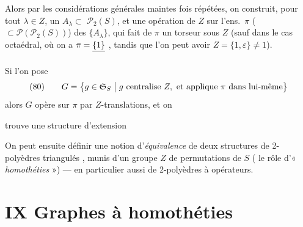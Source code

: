 \documentclass[11pt,a4paper]{article}
\begin{document}
Alors par les considérations générales maintes fois répétées, on construit, pour tout $\lambda \in Z$, un $A_\lambda \subset$ \struck{\ill{}} $\mathcal{P}_2(S)$, et une opération  de $Z$ sur l'ens.\ $\pi$ ($\subset \mathcal{P}(\mathcal{P}_2(S))$) des $\{A_\lambda\}$, qui fait de $\pi$ un torseur sous $Z$ (sauf dans le cas octaédral, où on a $\pi = \struck{\{1\}}$ , tandis que l'on peut avoir $Z = \{1, \varepsilon\} \neq 1$).

Si l'on pose
\[
(80) \qquad G = \bigl\{ g \in \mathfrak{S}_S \bigm| g \text{ centralise } Z, \text{ et applique } \pi \text{ dans lui-même} \bigr\}
\]
alors $G$ opère sur $\pi$ par $Z$-translations, et on

trouve une structure d'extension


On peut ensuite définir une notion d'\emph{équivalence} de deux structures de 2-polyèdres  triangulés , munis d'un groupe $Z$ \struck{\ill{}} de permutations de $S$ ( le rôle d'« \emph{homothéties} ») — en particulier aussi de 2-polyèdres à opérateurs.


\section{IX Graphes à homothéties}
\end{document}
